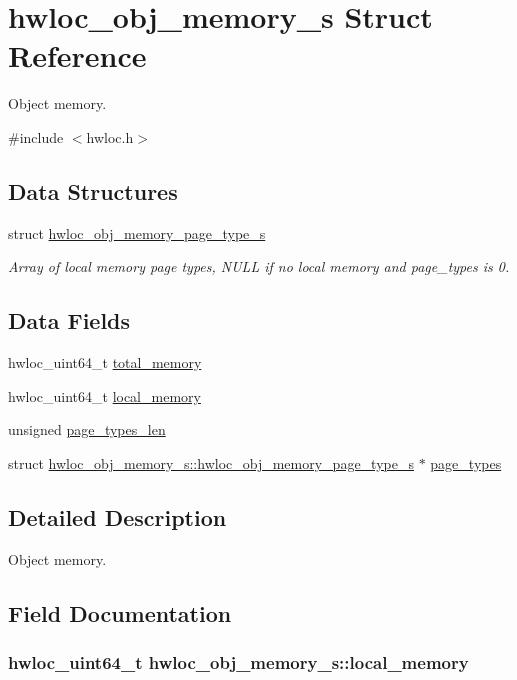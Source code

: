 \hypertarget{a00020}{
\section{hwloc\_\-obj\_\-memory\_\-s Struct Reference}
\label{a00020}
}


Object memory.  




{\ttfamily \#include $<$hwloc.h$>$}

\subsection*{Data Structures}
\begin{DoxyCompactItemize}
\item 
struct \hyperlink{a00019}{hwloc\_\-obj\_\-memory\_\-page\_\-type\_\-s}
\begin{DoxyCompactList}\small\item\em Array of local memory page types, {\ttfamily NULL} if no local memory and {\ttfamily page\_\-types} is 0. \item\end{DoxyCompactList}\end{DoxyCompactItemize}
\subsection*{Data Fields}
\begin{DoxyCompactItemize}
\item 
hwloc\_\-uint64\_\-t \hyperlink{a00020_a8befd0b3f4f8b695cafed04b31f36a44}{total\_\-memory}
\item 
hwloc\_\-uint64\_\-t \hyperlink{a00020_aace044c7f3fd9dffe50202296bf1dc5a}{local\_\-memory}
\item 
unsigned \hyperlink{a00020_a208c27f4491077d7fb9ba5db8b29cb57}{page\_\-types\_\-len}
\item 
struct \hyperlink{a00019}{hwloc\_\-obj\_\-memory\_\-s::hwloc\_\-obj\_\-memory\_\-page\_\-type\_\-s} $\ast$ \hyperlink{a00020_a865eba7b12b986d72dbe7a2cfd97c50d}{page\_\-types}
\end{DoxyCompactItemize}


\subsection{Detailed Description}
Object memory. 

\subsection{Field Documentation}
\hypertarget{a00020_aace044c7f3fd9dffe50202296bf1dc5a}{
\subsubsection[{local\_\-memory}]{\setlength{\rightskip}{0pt plus 5cm}hwloc\_\-uint64\_\-t {\bf hwloc\_\-obj\_\-memory\_\-s::local\_\-memory}}}
\label{a00020_aace044c7f3fd9dffe50202296bf1dc5a}


